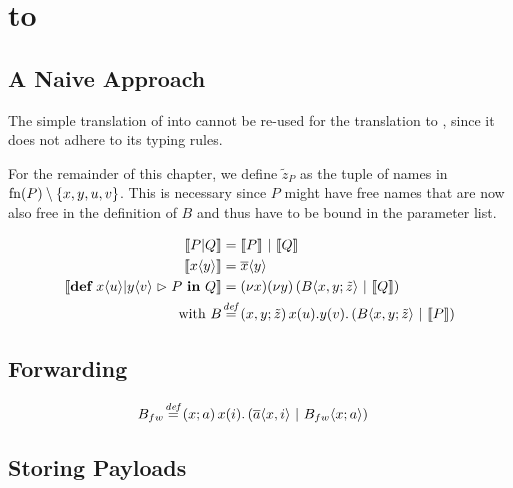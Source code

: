 \section{\CoreJoinCalc to \ActorPiCalc}

\subsection{A Naive Approach}

The simple translation of \joincalc into \asyncpicalc
\cite{fournet_reflexive_1996}
cannot be re-used for the translation to \actorpicalc,
since it does not adhere to its typing rules.

For the remainder of this chapter, we define
$\tilde{z}_P$
as the tuple of names in
$\operatorname{fn}(P) \setminus {\{x, y, u, v\}}$.
This is necessary since $P$ might have free names
that are now also free in the definition of $B$ and thus
have to be bound in the parameter list.

\begin{align*}
  \encMJtoAP{P \jpar Q}
  &= \encMJtoAP{P} \apar \encMJtoAP{Q}
  \\
  \encMJtoAP{\jsnd{x}{y}}
  &= \asnd{x}{y}
  \\
  \encMJtoAP{\jdef{\jrct{\jrcv{x}{u} \jpat \jrcv{y}{v}}{P}}{Q}}
  &= \anew{x}{\anew{y}{\parens{\ains{B}{x, y}{\tilde{z}} \apar \encMJtoAP{Q}}}}
  \\
  \text{with }
  \adef*{B}{x,y}{\tilde{z}}{\arcv{x}{u} . \arcv{y}{v} . \parens{\ains{B}{x, y}{\tilde{z}} \apar \encMJtoAP{P}}}
  \\
\end{align*}



\subsection{Forwarding}



\begin{align*}
  \adef*{B_{fw}}{x}{a}{\arcv{x}{i} . \parens{\asnd{a}{x,i} \apar \ains{B_{fw}}{x}{a}}}
\end{align*}

\subsection{Storing Payloads}

